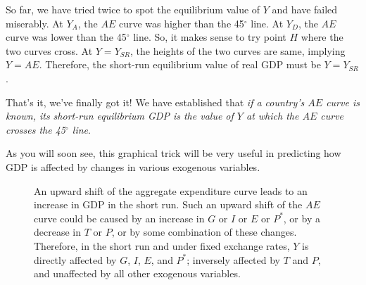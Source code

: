 \documentclass[
  letterpaper,
]{book}
\theoremstyle{plain}
\theoremstyle{remark}
\begin{document}
So far, we have tried twice to spot the equilibrium value of \(Y\) and
have failed miserably. At \(Y_A\), the \(AE\) curve was higher than the
45\(^{\circ}\) line. At \(Y_D\), the \(AE\) curve was lower than the
45\(^{\circ}\) line. So, it makes sense to try point \(H\) where the two
curves cross. At \(Y=Y_{SR}\), the heights of the two curves are same,
implying \(Y=AE\). Therefore, the short-run equilibrium value of real
GDP must be \(Y=Y_{SR}\).

That's it, we've finally got it! We have established that \emph{if a
country's \(AE\) curve is known, its short-run equilibrium GDP is the
value of \(Y\) at which the \(AE\) curve crosses the 45\(^{\circ}\)
line}.

As you will soon see, this graphical trick will be very useful in
predicting how GDP is affected by changes in various exogenous
variables.

\begin{figure}


\caption{\label{fig-AE-shifts}An upward shift of the aggregate
expenditure curve leads to an increase in GDP in the short run. Such an
upward shift of the \(AE\) curve could be caused by an increase in \(G\)
or \(I\) or \(E\) or \(P^*\), or by a decrease in \(T\) or \(P\), or by
some combination of these changes. Therefore, in the short run and under
fixed exchange rates, \(Y\) is directly affected by \(G\), \(I\), \(E\),
and \(P^*\); inversely affected by \(T\) and \(P\), and unaffected by
all other exogenous variables.}

\end{figure}%
\end{document}
